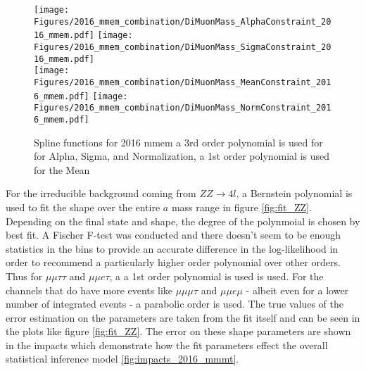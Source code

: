 \begin{figure}[ht!b]
    \centering 
    \texttt{[image: Figures/2016\_mmem\_combination/DiMuonMass\_AlphaConstraint\_2016\_mmem.pdf]}
    \texttt{[image: Figures/2016\_mmem\_combination/DiMuonMass\_SigmaConstraint\_2016\_mmem.pdf]}\\
    \texttt{[image: Figures/2016\_mmem\_combination/DiMuonMass\_MeanConstraint\_2016\_mmem.pdf]}
    \texttt{[image: Figures/2016\_mmem\_combination/DiMuonMass\_NormConstraint\_2016\_mmem.pdf]}\\
    \caption{\label{fig:spline_2016_mmem} Spline functions for 2016 mmem a 3rd order polynomial is used for  for Alpha, Sigma, and Normalization, a 1st order polynomial is used for the Mean}
\end{figure}

For the irreducible background coming from $ZZ\rightarrow 4 l$, a Bernstein polynomial is used to fit the shape over the entire $a$ mass range in figure \ref{fig:fit_ZZ}. Depending on the final state and shape, the degree of the polynmoial is chosen by best fit. A Fischer F-test was conducted and there doesn't seem to be enough statistics in the bins to provide an accurate difference in the log-likelihood in order to recommend a particularly higher order polynomial over other orders. Thus for $\mu\mu\tau\tau$ and $\mu\mu e \tau$, a a 1st order polynomial is used is used. For the channels that do have more events like $\mu\mu\mu\tau$ and $\mu\mu e \mu$ - albeit even for a lower number of integrated events - a parabolic order is used. 
The true values of the error estimation on the parameters are taken from the fit itself and can be seen in the plots like figure \ref{fig:fit_ZZ}. The error on these shape parameters are shown in the impacts which demonstrate how the fit parameters effect the overall statistical inference model \ref{fig:impacts_2016_mmmt}. 

